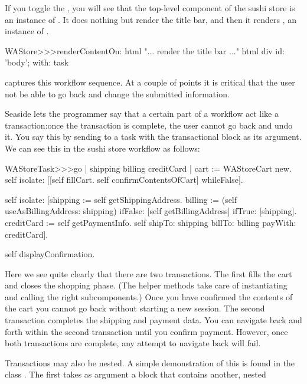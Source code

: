 \documentclass[a4paper,10pt,twoside]{book}
\begin{document}
If you toggle the , you will see that the top-level component of
the sushi store is an instance of .
It does nothing but render the title bar, and then it renders , an instance of
.

\begin{code}{}
WAStore>>>renderContentOn: html
	"... render the title bar ..."
	html div id: 'body'; with: task
\end{code}

 captures this workflow sequence. At a couple of points it is
critical that the user not be able to go back and change the submitted information.


Seaside lets the programmer say that a certain part of a workflow act like a transaction:once the transaction is complete, the user cannot go back and undo it.
You say this by sending  to a task with the transactional
block as its argument.
We can see this in the sushi store workflow as follows:

\begin{code}{}
WAStoreTask>>>go
	| shipping billing creditCard |
	cart := WAStoreCart new.
	self isolate:
		[[self fillCart.
		self confirmContentsOfCart]
			whileFalse].

	self isolate:
		[shipping := self getShippingAddress.
		billing := (self useAsBillingAddress: shipping)
					ifFalse: [self getBillingAddress]
					ifTrue: [shipping].
		creditCard := self getPaymentInfo.
		self shipTo: shipping billTo: billing payWith: creditCard].

	self displayConfirmation.
\end{code}

Here we see quite clearly that there are two transactions.
The first fills the cart and closes the shopping phase.
(The helper methods  \etc take care of instantiating and calling the right
subcomponents.)
Once you have confirmed the contents of the cart you cannot go back without starting a
new session.
The second transaction completes the shipping and payment data.
You can navigate back and forth within the second transaction until you confirm payment.
However, once both transactions are complete, any attempt to navigate back will fail.

Transactions may also be nested.
A simple demonstration of this is found in the class .
The first  takes as argument a block that contains another, nested
\end{document}
